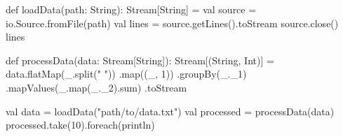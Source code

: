 def loadData(path: String): Stream[String] = {
  val source = io.Source.fromFile(path)
  val lines = source.getLines().toStream
  source.close()
  lines
}

def processData(data: Stream[String]): Stream[(String, Int)] = {
  data.flatMap(_.split(" "))
      .map((_, 1))
      .groupBy(_._1)
      .mapValues(_.map(_._2).sum)
      .toStream
}

val data = loadData("path/to/data.txt")
val processed = processData(data)
processed.take(10).foreach(println)